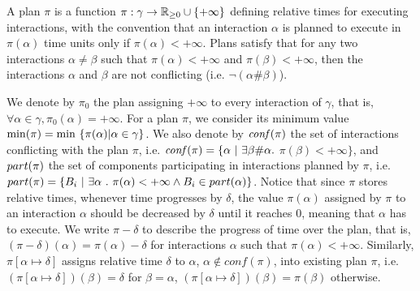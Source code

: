 \begin{definition}[Plan]\label{def:plan}
A plan $\pi$ is a function $\pi:\gamma \to\mathbb{R}_{\ge 0} \cup \{ +\infty \}$ defining relative times
for executing interactions, with the convention that an interaction $\alpha$ is planned to 
execute in $\pi(\alpha)$ time units only if $\pi(\alpha) < +\infty$.
Plans satisfy that for any two interactions $\alpha \neq \beta$ such that $\pi(\alpha) < +\infty$
and $\pi(\beta) < +\infty$, then the interactions $\alpha$ and $\beta$ are not conflicting 
(i.e. $\neg(\alpha\#\beta)$).
\end{definition}
We denote by $\pi_0$ the plan assigning $+\infty$ to every interaction of $\gamma$, that is,
$\forall\alpha\in\gamma,\pi_0(\alpha)=+\infty$. For a plan $\pi$, we consider its minimum value
$\pmin=\min\ \{\pi(\alpha)|\alpha\in\gamma\}$. 
We also denote by $\mathit{conf}(\pi)$ the set of interactions conflicting with the plan $\pi$, i.e. 
$\mathit{conf}(\pi) = \{ \alpha \ | \ \exists \beta \# \alpha.$ $ \pi (\beta) < +\infty \}$, 
and $part(\pi)$ the set of components participating in interactions planned by 
$\pi$, i.e. $\p{\pi}=\{B_i\ |\ \exists\alpha\ . \ \pi(\alpha)<+\infty\wedge B_i\in\p{\alpha} \}$.
Notice that since $\pi$ stores relative times, whenever time progresses by $\delta$, the value 
$\pi(\alpha)$ assigned by $\pi$ to an interaction $\alpha$ should be decreased by $\delta$ 
until it reaches $0$, meaning that $\alpha$ has to execute.
We write $\pi-\delta$ to describe the progress of time 
over the plan, that is, $(\pi-\delta)(\alpha) = \pi(\alpha) - \delta$ for interactions $\alpha$ 
such that $\pi(\alpha) < +\infty$.
Similarly, $\pi [ \alpha \mapsto \delta ]$ assigns relative time $\delta$ to $\alpha$, 
$\alpha \notin conf(\pi)$, into existing plan $\pi$, i.e. $(\pi [ \alpha \mapsto \delta ])
(\beta) = \delta$ for $\beta = \alpha$, $(\pi [ \alpha \mapsto \delta ])(\beta) = \pi(\beta)$ 
otherwise.

